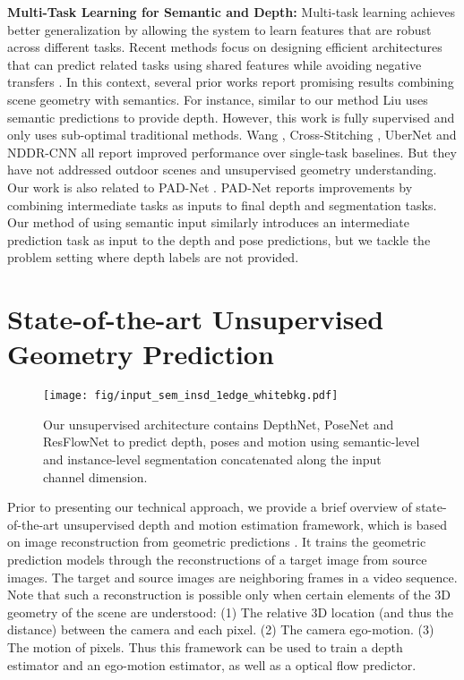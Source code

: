 \documentclass[10pt,twocolumn]{article}
\newcommand{\Noindent}{\vspace{2pt} \noindent}
\newcommand{\partitle}[1]{\Noindent\textbf{#1: }}
\begin{document}
\partitle{Multi-Task Learning for Semantic and Depth}Multi-task learning \cite{Caruana:1997:ML:262868.262872} achieves better generalization by allowing the system to learn features that are robust across different tasks. Recent methods focus on designing efficient architectures that can predict related tasks using shared features while avoiding negative transfers \cite{Misra2016CrossStitchNF,He:2017:AWM:3123266.3123424,Lu_2017_CVPR,Meyerson2017BeyondSH,8100062,Gao2018NDDRCNNLF}. In this context, several prior works report promising results combining scene geometry with semantics. For instance, similar to our method Liu \etal \cite{Liu2010SingleID} uses semantic predictions to provide depth. However, this work is fully supervised and only uses sub-optimal traditional methods. Wang \etal \cite{Wang_2015_CVPR}, Cross-Stitching \cite{Misra2016CrossStitchNF}, UberNet \cite{8100062} and NDDR-CNN \cite{Gao2018NDDRCNNLF} all report improved performance over single-task baselines. But they have not addressed outdoor scenes and unsupervised geometry understanding. Our work is also related to PAD-Net \cite{Xu2018PADNetMG}. PAD-Net reports improvements by combining intermediate tasks as inputs to final depth and segmentation tasks. Our method of using semantic input similarly introduces an intermediate prediction task as input to the depth and pose predictions, but we tackle the problem setting where depth labels are not provided.  \section{State-of-the-art Unsupervised Geometry Prediction}
\label{sec:background}

\begin{figure*}
    \centering
    \texttt{[image: fig/input\_sem\_insd\_1edge\_whitebkg.pdf]}
    \caption{Our unsupervised architecture contains DepthNet, PoseNet and ResFlowNet to predict depth, poses and motion using semantic-level and instance-level segmentation concatenated along the input channel dimension. }
    \label{fig:arch_with_semantic_input}
\end{figure*}

Prior to presenting our technical approach, we provide a brief overview of state-of-the-art unsupervised depth and motion estimation framework, which is based on image reconstruction from geometric predictions \cite{zhou2017unsupervised,yin2018geonet}. It trains the geometric prediction models through the reconstructions of a target image from source images. The target and source images are neighboring frames in a video sequence. Note that such a reconstruction is possible only when certain elements of the 3D geometry of the scene are understood: (1) The relative 3D location (and thus the distance) between the camera and each pixel. (2) The camera ego-motion. (3) The motion of pixels. Thus this framework can be used to train a depth estimator and an ego-motion estimator, as well as a optical flow predictor.
\end{document}
